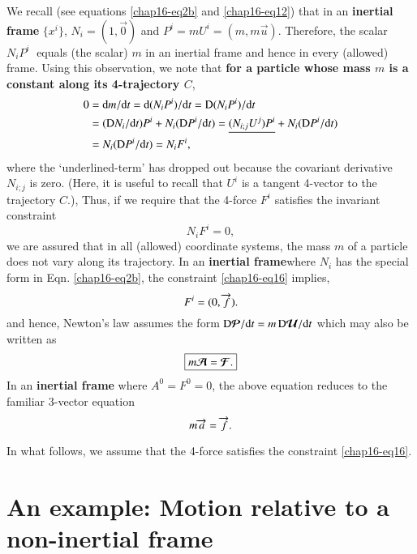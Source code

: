 We recall (see equations \eqref{chap16-eq2b} and \eqref{chap16-eq12})  that in  an \textbf{inertial frame} $\{x^i\}$, $N_i=(1,\vec{0})$ and $P^i=mU^i= (m,m\vec{u})$. Therefore,  the scalar $N_iP^i\;$ equals (the scalar) $m$ in  an inertial frame and hence in every (allowed) frame. Using this observation, we note that  \textbf{for a particle whose mass $m$ is a constant along its 4-trajectory $C$},
\begin{align*}
0 &= \mathrm{d} m/\mathrm{d} t = \mathrm{d} (N_i P^i )/\mathrm{d} t =
{\mathrm{D}}(N_i P^i )/\mathrm{d} t  \notag \\  
&=({\mathrm{D}}N_i/\mathrm{d} t)P^i + N_i ({\mathrm{D}}P^i/\mathrm{d} t) 
= 
\underline{(N_{i;j}U^j)P^i 
} +N_i({\mathrm{D}}P^i/\mathrm{d} t) \notag \\  
&= N_i({\mathrm{D}}P^i/\mathrm{d} t) = N_i F^i,
\end{align*}
where the `underlined-term' has dropped  out because the covariant derivative $N_{i;j}$ is zero. (Here, it is useful to recall that $U^i$ is a tangent 4-vector to the trajectory $C$.), Thus, if we require that the  4-force  $F^i $ satisfies the  invariant constraint
\begin{equation}
N_i F^i =0,\label{chap16-eq16}
\end{equation}
we are assured that in all (allowed) coordinate systems, the mass $m$ of a particle does not vary along its trajectory. In an \textbf{inertial frame}where $N_i$ has the special form in Eqn. \eqref{chap16-eq2b}, the constraint \eqref{chap16-eq16} implies, 
\begin{equation}
F^i =(0, \overrightarrow{f}).\label{chap16-eq17}
\end{equation}
and hence, Newton's law assumes the form ${{\mathrm{D}}}\bm{\mathcal{P}}/\mathrm{d} t=m\,{{\mathrm{D}}}\bm{\mathcal{U}}/\mathrm{d} t $  which may also be written as
\begin{equation}
\boxed{m\bm{\mathcal{A}}  =\bm{\mathcal{F}}.}\label{chap16-eq18}
\end{equation}
In an \textbf{inertial frame} where $ A^0 =F^0=0$, the above equation reduces to the familiar 3-vector equation
\begin{equation}
m\overrightarrow{a}  =\overrightarrow{f}.\label{chap16-eq19}
\end{equation}

In what follows, we assume that the 4-force satisfies the constraint \eqref{chap16-eq16}.

\section{An example: Motion relative to a non-inertial frame}\label{chap16-sec6}

